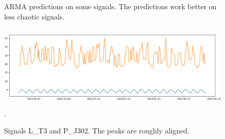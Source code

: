 \documentclass[]{article}
\begin{document}
\begin{figure}[H]
\begin{minipage}{.5\textwidth}
   \caption{ARMA predictions on some signals. The predictions work better on less chaotic signals.}
  \label{fig:test2}
\end{minipage}
\begin{minipage}{.5\textwidth}
  \includegraphics[width=2\linewidth, height=4cm]{./visuallizations/correlated_signals.png}.
  \label{correlation}
  \caption{Signals L\_T3 and P\_J302. The peaks are roughly aligned.}
\end{minipage}%
\end{figure}
\end{document}
